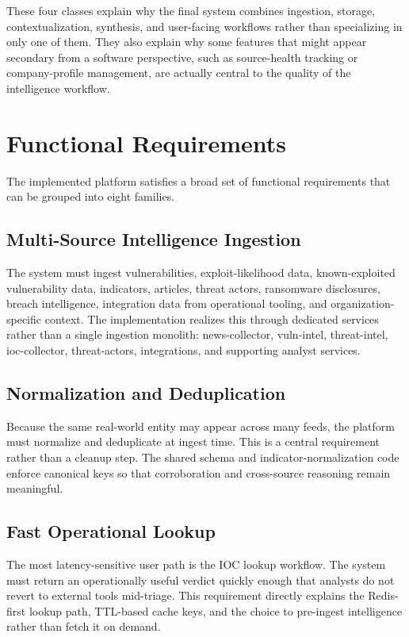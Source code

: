 These four classes explain why the final system combines ingestion, storage, contextualization, synthesis, and user-facing workflows rather than specializing in only one of them. They also explain why some features that might appear secondary from a software perspective, such as source-health tracking or company-profile management, are actually central to the quality of the intelligence workflow.

\section{Functional Requirements}
The implemented platform satisfies a broad set of functional requirements that can be grouped into eight families.

\subsection{Multi-Source Intelligence Ingestion}
The system must ingest vulnerabilities, exploit-likelihood data, known-exploited vulnerability data, indicators, articles, threat actors, ransomware disclosures, breach intelligence, integration data from operational tooling, and organization-specific context. The implementation realizes this through dedicated services rather than a single ingestion monolith: news-collector, vuln-intel, threat-intel, ioc-collector, threat-actors, integrations, and supporting analyst services.

\subsection{Normalization and Deduplication}
Because the same real-world entity may appear across many feeds, the platform must normalize and deduplicate at ingest time. This is a central requirement rather than a cleanup step. The shared schema and indicator-normalization code enforce canonical keys so that corroboration and cross-source reasoning remain meaningful.

\subsection{Fast Operational Lookup}
The most latency-sensitive user path is the IOC lookup workflow. The system must return an operationally useful verdict quickly enough that analysts do not revert to external tools mid-triage. This requirement directly explains the Redis-first lookup path, TTL-based cache keys, and the choice to pre-ingest intelligence rather than fetch it on demand.

